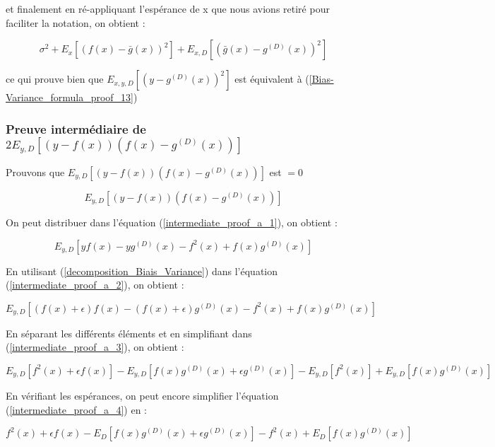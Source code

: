 \documentclass[a4paper]{article}
\begin{document}
et finalement en ré-appliquant l'espérance de x que nous avions retiré pour faciliter la notation, on obtient :

\begin{equation}
	\label{Bias-Variance_formula_proof_13}
	\sigma^2 + E_x[(f(x) -\bar{g}(x))^2] + E_{x,D} [(\bar{g}(x) - g^{(D)}(x))^2]
\end{equation}

ce qui prouve bien que $ E_{x,y,D}[(y-g^{(D)}(x))^2] $ est équivalent à (\ref{Bias-Variance_formula_proof_13})
\newpage

\subsubsection{Preuve intermédiaire de $2E_{y,D} [(y-f(x)) (f(x) - g^{(D)}(x)) ]$}
\label{intermediate_proof_a_subsection}
Prouvons que $E_{y,D} [(y-f(x)) (f(x) - g^{(D)}(x)) ]$ est $= 0$ 

\begin{equation}
\label{intermediate_proof_a_1}
	E_{y,D} [(y-f(x)) (f(x) - g^{(D)}(x)) ]
\end{equation}

On peut distribuer dans l'équation (\ref{intermediate_proof_a_1}), on obtient :

\begin{equation}
\label{intermediate_proof_a_2}
	E_{y,D} [yf(x) -yg^{(D)}(x) - f^2(x) + f(x)g^{(D)}(x)]
\end{equation}

En utilisant (\ref{decomposition_Biais_Variance}) dans l'équation (\ref{intermediate_proof_a_2}), on obtient :

\begin{equation}
\label{intermediate_proof_a_3}
E_{y,D} [(f(x) + \epsilon)f(x) -(f(x) + \epsilon)g^{(D)}(x) - f^2(x) + f(x)g^{(D)}(x)]
\end{equation}

En séparant les différents éléments et en simplifiant dans (\ref{intermediate_proof_a_3}), on obtient :

\begin{equation}
\label{intermediate_proof_a_4}
E_{y,D} [f^2(x) + \epsilon f(x)] - E_{y,D}[f(x)g^{(D)}(x) + \epsilon g^{(D)}(x)] - E_{y,D}[f^2(x)] + E_{y,D}[f(x)g^{(D)}(x)]
\end{equation}

En vérifiant les espérances, on peut encore simplifier l'équation (\ref{intermediate_proof_a_4}) en :

\begin{equation}
\label{intermediate_proof_a_5}
f^2(x) + \epsilon f(x) - E_D[f(x)g^{(D)}(x) + \epsilon g^{(D)}(x)] - f^2(x) + E_D[ f(x)g^{(D)}(x)]
\end{equation}
\end{document}
